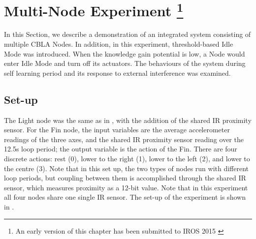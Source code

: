 \FloatBarrier

\section[Multi-Node Experiment]
{Multi-Node Experiment
	\footnote{An early version of this chapter has been submitted to IROS 2015 \cite{Chan2015} }}\label{sec:multi-node}


In this Section, we describe a demonstration of an integrated system consisting of multiple CBLA Nodes. In addition, in this experiment, threshold-based Idle Mode was introduced. When the knowledge gain potential is low, a Node would enter Idle Mode and turn off its actuators. The behaviours of the system during self learning period and its response to external interference was examined.

\subsection{Set-up}
The Light node was the same as in , with the addition of the shared IR proximity sensor. For the Fin node, the input variables are the average accelerometer readings of the three axes, and the shared IR proximity sensor reading over the 12.5s loop period; the output variable is the action of the Fin. There are four discrete actions: rest (0), lower to the right (1), lower to the left (2), and lower to the centre (3). Note that in this set up, the two types of nodes run with different loop periods, but coupling between them is accomplished through the shared IR sensor, which measures proximity as a 12-bit value. Note that in this experiment all four nodes share one single IR sensor. The set-up of the experiment is shown in .

